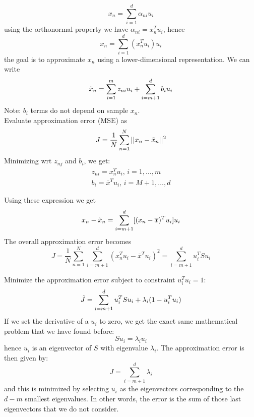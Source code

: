\begin{equation}
    x_{n} = \sum_{i=1}^{d}\alpha_{ni}u_{i}
\end{equation}
using the orthonormal property we have $\alpha_{ni} = x_{n}^{T}u_{i}$, hence
\begin{equation}
    x_{n} = \sum_{i=1}^{d}(x_{n}^{T}u_{i})u_{i}
\end{equation}
the goal is to approximate $x_{n}$ using a lower-dimensional representation. We can write
\begin{equation}
    \Tilde{x}_{n} = \sum_{i=1}^{m}z_{ni}u_{i} + \sum_{i=m+1}^{d}b_{i}u_{i}
\end{equation}
Note: $b_{i}$ terms do not depend on sample $x_{n}$. \\
Evaluate approximation error (MSE) as
\begin{equation}
    J = \frac{1}{N}\sum_{n=1}^{N}||x_{n} - \Tilde{x}_{n}||^{2}
\end{equation}
Minimizing wrt $z_{nj}$ and $b_{i}$, we get:
\begin{equation}
    \begin{multlined}
        z_{ni} = x_{n}^{T}u_{i}\text{, } i= 1, \dots, m \\
        b_{i} = \overline{x}^{T}u_{i}\text{, } i= M + 1, \dots, d
    \end{multlined}
\end{equation}

Using these expression we get
\begin{equation}
    x_{n} - \Tilde{x}_{n} = \sum_{i=m+1}^{d} [(x_{n} - \overline{x})^{T}u_{i}]u_{i}
\end{equation}
The overall approximation error becomes
\begin{equation}
    J = \frac{1}{N}\sum_{n=1}^{N}\sum_{i=m+1}^{d}(x_{n}^{T}u_{i} - \overline{x}^{T}u_{i})^{2} = \sum_{i=m+1}^{d}u_{i}^{T}Su_{i}
\end{equation}

Minimize the approximation error subject to constraint $u_{i}^{T}u_{i} = 1$:
\begin{equation}
    \Tilde{J} = \sum_{i=m+1}^{d}u_{i}^{T}Su_{i} + \lambda_{i}(1 - u_{i}^{T}u_{i})
\end{equation}
If we set the derivative of a $u_{i}$ to zero, we get the exact same mathematical problem that we have found before:
\begin{equation}
    Su_{i} = \lambda_{i}u_{i}
\end{equation}
hence $u_{i}$ is an eigenvector of $S$ with eigenvalue $\lambda_{i}$. The approximation error is then given by:
\begin{equation}
    J = \sum_{i=m+1}^{d}\lambda_{i}
\end{equation}
and this is minimized by selecting $u_{i}$ as the eigenvectors corresponding to the $d - m$ smallest eigenvalues. In other words, the error is the sum of those last eigenvectors that we do not consider.

